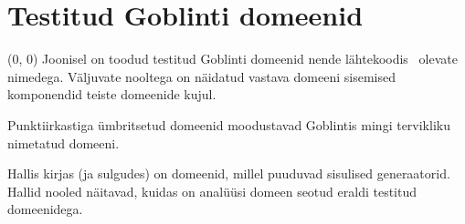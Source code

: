 \documentclass[../thesis.tex]{subfiles}
\begin{document}
\section{Testitud Goblinti domeenid}
\label{app:goblint-domeenid}
\begin{textblock}{5.5}(0, 0)
Joonisel on toodud testitud Goblinti domeenid nende lähtekoodis~\cite{goblint_repo} olevate nimedega. Väljuvate nooltega on näidatud vastava domeeni sisemised komponendid teiste domeenide kujul.

Punktiirkastiga ümbritsetud domeenid moodustavad Goblintis mingi tervikliku nimetatud domeeni.

Hallis kirjas (ja sulgudes) on domeenid, millel puuduvad sisulised generaatorid.
Hallid nooled näitavad, kuidas on analüüsi domeen seotud eraldi testitud domeenidega.
\end{textblock}
\vspace{-7ex} %
\end{document}
